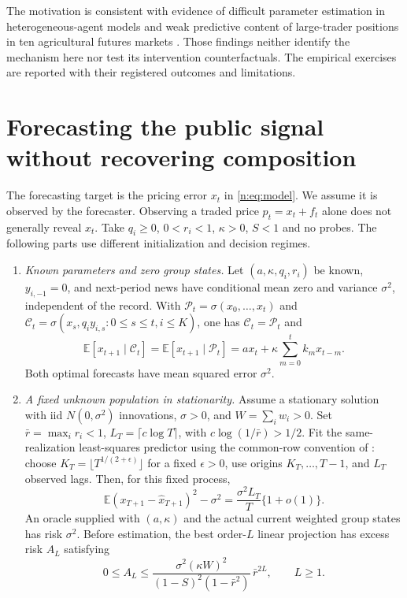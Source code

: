 The motivation is consistent with evidence of difficult parameter estimation in heterogeneous-agent models \citep{lux2018} and weak predictive content of large-trader positions in ten agricultural futures markets \citep{sanders2009}. Those findings neither identify the mechanism here nor test its intervention counterfactuals. The empirical exercises are reported with their registered outcomes and limitations.

\section{Forecasting the public signal without recovering composition}\label{n:irr_sec}

The forecasting target is the pricing error $x_t$ in \eqref{n:eq:model}. We assume it is observed by the forecaster. Observing a traded price $p_t=x_t+f_t$ alone does not generally reveal $x_t$. Take $q_i\ge0$, $0<r_i<1$, $\kappa>0$, $S<1$ and no probes. The following parts use different initialization and decision regimes.

\begin{theorem}\label{n:irr}
\begin{enumerate}[label=(\roman*),itemsep=1pt]
\item \emph{Known parameters and zero group states.} Let $(a,\kappa,q_i,r_i)$ be known, $y_{i,-1}=0$, and next-period news have conditional mean zero and variance $\sigma^2$, independent of the record. With $\mathcal P_t=\sigma(x_0,\ldots,x_t)$ and $\mathcal C_t=\sigma(x_s,q_i y_{i,s}:0\le s\le t, i\le K)$, one has $\mathcal C_t=\mathcal P_t$ and
\[
\mathbb E[x_{t+1}\mid\mathcal C_t]=\mathbb E[x_{t+1}\mid\mathcal P_t]
=a x_t+\kappa\sum_{m=0}^t k_m x_{t-m}.
\]
Both optimal forecasts have mean squared error $\sigma^2$.
\item \emph{A fixed unknown population in stationarity.} Assume a stationary solution with iid $N(0,\sigma^2)$ innovations, $\sigma>0$, and $W=\sum_iw_i>0$. Set $\bar r=\max_i r_i<1$, $L_T=\lceil c\log T\rceil$, with $c\log(1/\bar r)>1/2$. Fit the same-realization least-squares predictor using the common-row convention of \citet[Proposition~2]{ingwei2005}: choose $K_T=\lfloor T^{1/(2+\epsilon)}\rfloor$ for a fixed $\epsilon>0$, use origins $K_T,\ldots,T-1$, and $L_T$ observed lags. Then, for this fixed process,
\[
\mathbb E(x_{T+1}-\hat x_{T+1})^2-\sigma^2
=\frac{\sigma^2 L_T}{T}\{1+o(1)\}.
\]
An oracle supplied with $(a,\kappa)$ and the actual current weighted group states has risk $\sigma^2$. Before estimation, the best order-$L$ linear projection has excess risk $A_L$ satisfying
\[
0\le A_L\le
\frac{\sigma^2(\kappa W)^2}{(1-S)^2(1-\bar r^2)}\,\bar r^{2L},\qquad L\ge1.
\]
\end{enumerate}
\end{theorem}

